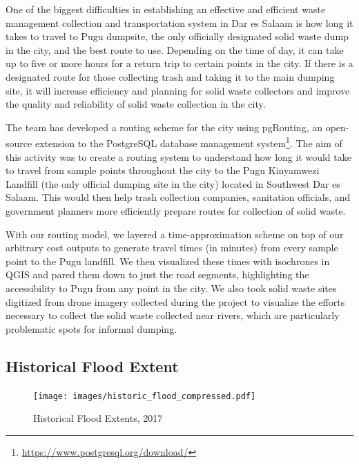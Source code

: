 \documentclass[a4paper,12pt,twoside]{article}
\begin{document}
\begin{multicols}{2}
One of the biggest difficulties in establishing an effective and efficient waste management collection and transportation system in Dar es Salaam is how long it takes to travel to Pugu dumpsite, the only officially designated solid waste dump in the city, and the best route to use. Depending on the time of day, it can take up to five or more hours for a return trip to certain points in the city. If there is a designated route for those collecting trash and taking it to the main dumping site, it will increase efficiency and planning for solid waste collectors and improve the quality and reliability of solid waste collection in the city.

The team has developed a routing scheme for the city using pgRouting, an open-source extension to the PostgreSQL database management system\footnote{\url{https://www.postgresql.org/download/}}. The aim of this activity was to create a routing system to understand how long it would take to travel from sample points throughout the city to the Pugu Kinyamwezi Landfill (the only official dumping site in the city) located in Southwest Dar es Salaam. This would then help trash collection companies, sanitation officials, and government planners more efficiently prepare routes for collection of solid waste.

With our routing model, we layered a time-approximation scheme on top of our arbitrary cost outputs to generate travel times (in minutes) from every sample point to the Pugu landfill. We then visualized these times with isochrones in QGIS and pared them down to just the road segments, highlighting the accessibility to Pugu from any point in the city. We also took solid waste sites digitized from drone imagery collected during the project to visualize the efforts necessary to collect the solid waste collected near rivers, which are particularly problematic spots for informal dumping.
\end{multicols}

\newpage
\subsection{Historical Flood Extent}
\begin{figure}[h]
    \centering
    \texttt{[image: images/historic\_flood\_compressed.pdf]}
    \caption{Historical Flood Extents, 2017}
\end{figure}
\end{document}
